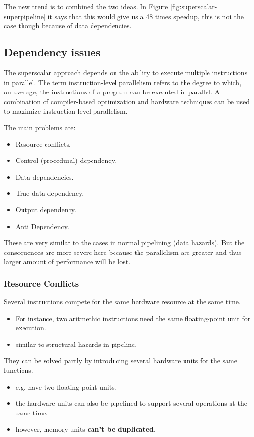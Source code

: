 The new trend is to combined the two ideas. In Figure \ref{fig:superscalar-superpipeline} it says that this would give us a 48 times speedup, this is not the case though because of data dependencies.

\subsection{Dependency issues}
The superscalar approach depends on the ability to execute multiple instructions in parallel. The term instruction-level parallelism refers to the degree to which, on average, the instructions of a program can be executed in parallel. A combination of compiler-based optimization and hardware techniques can be used to maximize instruction-level parallelism.

The main problems are:
\begin{itemize}
\item Resource conflicts.
\item Control (procedural) dependency.
\item Data dependencies.
\item True data dependency.
\item Output dependency.
\item Anti Dependency.
\end{itemize}
  
These are very similar to the cases in normal pipelining (data hazards). But the consequences are more severe here because the parallelism are greater and thus larger amount of performance will be lost.

\subsubsection{Resource Conflicts}
Several instructions compete for the same hardware resource at the same time.
\begin{itemize}
\item For instance, two aritmethic instructions need the same floating-point unit for execution.
\item similar to structural hazards in pipeline.
\end{itemize}

They can be solved \underline{partly} by introducing several hardware units for the same functions.
\begin{itemize}
\item e.g. have two floating point units.
\item the hardware units can also be pipelined to support several operations at the same time.
\item however, memory units \textbf{can't be duplicated}.
\end{itemize}
  
